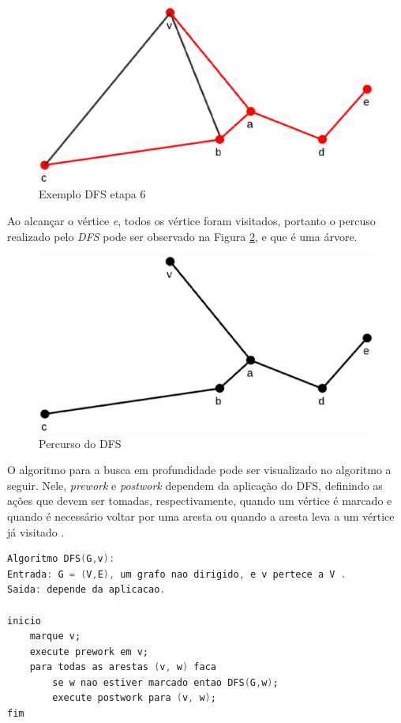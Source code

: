 \begin{figure}[!h]
	\centering
	\includegraphics[scale=0.4]{figuras/capitulo1/dfs/dfs6.eps}
	\caption{Exemplo DFS etapa 6}
	\label{dfs6}
\end{figure}

Ao alcançar o vértice \textit{e}, todos os vértice foram visitados, portanto o percuso realizado pelo \textit{DFS} pode ser observado na Figura \ref{dfs_percurso}, e que é uma árvore.

\begin{figure}[!h]
	\centering
	\includegraphics[scale=0.4]{figuras/capitulo1/dfs/dfs_percurso.eps}
	\caption{Percurso do DFS}
	\label{dfs_percurso}
\end{figure}

O algoritmo para a busca em profundidade pode ser visualizado no algoritmo a seguir. Nele, \textit{prework} e \textit{postwork} dependem da aplicação do DFS, definindo as ações que devem ser tomadas, respectivamente, quando um vértice é marcado e quando é necessário voltar por uma aresta ou quando a aresta leva a um vértice já visitado \cite{Manber:1989}.

\begin{lstlisting}[language=Ada]
Algoritmo DFS(G,v):
Entrada: G = (V,E), um grafo nao dirigido, e v pertece a V .
Saida: depende da aplicacao.

inicio
	marque v;
	execute prework em v;
	para todas as arestas (v, w) faca
		se w nao estiver marcado entao DFS(G,w);
		execute postwork para (v, w);
fim
\end{lstlisting}

